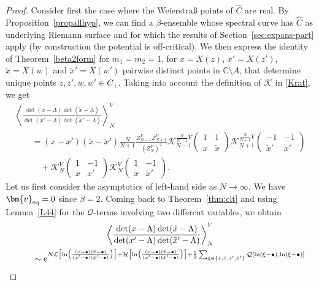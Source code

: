 \documentclass[pdftex]{sigma}
\numberwithin{equation}{section}
\newcommand{\mean}[1]{\left\langle{#1}\right\rangle}
\begin{document}
\begin{proof}
Consider first the case where the Weierstra\ss{} points of $\widehat{C}$ are
 real. By Proposition~\ref{propallhyp}, we can find a $\beta$-ensemble whose spectral curve has $\widehat{C}$ as underlying Riemann surface and for which the results of Section~\ref{sec:expans-part} apply (by construction the potential is off-critical).
 We then express the identity of Theorem~\ref{beta2form} for $m_1 = m_2 = 1$, for $x = X(z)$,
 $x' = X(z')$, $\tilde{x} = X(w)$ and $\tilde{x}' = X(w')$ pairwise distinct points in $\mathbb{C} \setminus A$, that determine unique points $z,z',w,w' \in C_+$. Taking into account the
 definition of $\mathcal{K}$ in \eqref{Krat}, we get
\begin{gather}
 \mean{ \frac{\det(x - \Lambda)\det(\tilde{x} - \Lambda)}{\det(x' - \Lambda) \det(\tilde{x}' - \Lambda)}}_{N}^{V}\nonumber \\
 \qquad{} = (x - x')(\tilde{x} - \tilde{x}')\frac{N}{N + 1} \frac{Z_{N - 1}^{V}Z_{N + 1}^{V}}{(Z_N^V)^2} \mathcal{K}^{\frac{N}{N - 1}V}_{N - 1}\left(\begin{matrix} 1 & 1 \\ x & \tilde{x} \end{matrix}\right) \mathcal{K}^{\frac{N}{N + 1}V}_{N + 1}\left(\begin{matrix} - 1 & -1 \\ \tilde{x}' & x' \end{matrix}\right)\nonumber\\
  \qquad\quad{} + \mathcal{K}_{N}^{V}\left(\begin{matrix} 1 & -1 \\ x & x' \end{matrix}\right)\mathcal{K}_{N}^{V}\left(\begin{matrix} 1 & -1 \\ \tilde{x} & \tilde{x}' \end{matrix}\right).\label{smallrelb2}
\end{gather}
Let us first consider the asymptotics of left-hand side as $N \rightarrow \infty$. We have $\bm{v}_{{\rm eq}} = 0$ since $\beta = 2$. Coming back to Theorem~\ref{thm:clt} and using Lemma~\ref{L44} for the $\mathcal{Q}$-terms involving two different variables, we obtain
\begin{gather}
 \mean{ \frac{\det(x - \Lambda)\det(\tilde{x} - \Lambda)}{\det(x' - \Lambda) \det(\tilde{x}' - \Lambda)}}_{N}^{V} \nonumber\\
\qquad {} \sim{}{\rm e}^{N\mathcal{L}\bigl[\ln\bigl(\frac{(x - \bullet)(\tilde{x} - \bullet)}{(x' - \bullet)(\tilde{x}' - \bullet)}\bigr)\bigr] + \mathcal{H}\bigl[\ln\bigl(\frac{(x - \bullet)(\tilde{x} - \bullet)}{(x' - \bullet)(\tilde{x}' - \bullet)}\bigr)\bigr] + \frac{1}{2} \sum_{\xi \in \{x,\tilde{x},x',\tilde{x}'\}} \mathcal{Q}[\ln(\xi - \bullet),\ln(\xi - \bullet)]} \nonumber\\

\end{gather}
\end{proof}
\end{document}
